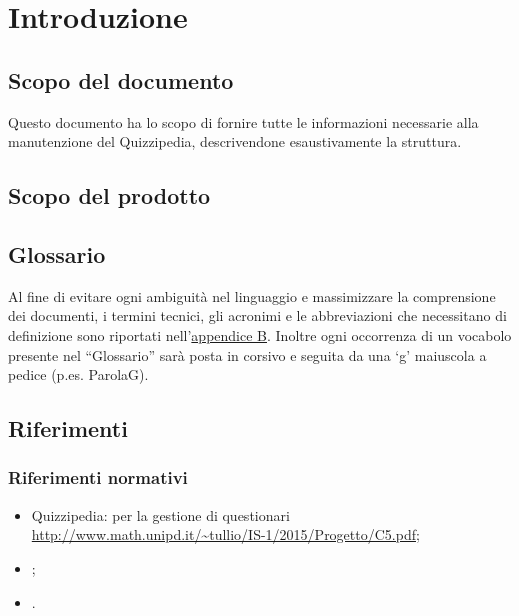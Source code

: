 \documentclass[a4paper, titlepage]{article}
\begin{document}
\pagestyle{fancy}	

\maketitle



\newpage
\tableofcontents

\newpage
\listoffigures

\newpage
\listoftables

\newpage
\clearpage
{}

	\section{Introduzione}
	\subsection{Scopo del documento}
	Questo documento ha lo scopo di fornire tutte le informazioni necessarie alla manutenzione del 
	Quizzipedia, descrivendone esaustivamente la struttura.
	
	\subsection{Scopo del prodotto}
	\SCOPO
	
	\subsection{Glossario}
	Al fine di evitare ogni ambiguità nel linguaggio e massimizzare la comprensione dei documenti, i termini tecnici, gli acronimi e le abbreviazioni che necessitano di definizione sono riportati nell'\hyperref[gl]{appendice B}.
	Inoltre ogni occorrenza di un vocabolo presente nel “Glossario” sarà posta in corsivo e seguita da
	una ‘g’ maiuscola a pedice (p.es. ParolaG).
	
	\subsection{Riferimenti}	
	\subsubsection{Riferimenti normativi}
	\begin{itemize}
		\item {} Quizzipedia:  per la gestione di questionari \newline \url{http://www.math.unipd.it/~tullio/IS-1/2015/Progetto/C5.pdf};
		\item {} \NdPdoc;
		\item {} \STdoc.
		
	\end{itemize}
\end{document}
